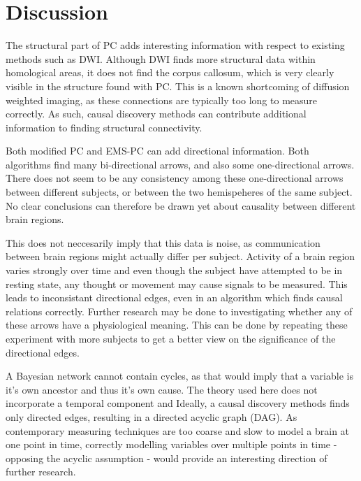 \documentclass[a4paper, 10pt, english, onecolumn]{article}
\begin{document}
\section{Discussion}

The structural part of PC adds interesting information with respect to existing methods such as DWI.
Although DWI finds more structural data within homological areas, it does not find the corpus callosum, which is very clearly visible in the structure found with PC.
This is a known shortcoming of diffusion weighted imaging, as these connections are typically too long to measure correctly.
As such, causal discovery methods can contribute additional information to finding structural connectivity.

Both modified PC and EMS-PC can add directional information.
Both algorithms find many bi-directional arrows, and also some one-directional arrows.
There does not seem to be any consistency among these one-directional arrows  between different subjects, or between the two hemispeheres of the same subject.
No clear conclusions can therefore be drawn yet about causality between different brain regions.

This does not neccesarily imply that this data is noise, as communication between brain regions might actually differ per subject.
Activity of a brain region varies strongly over time and even though the subject have attempted to be in resting state, any thought or movement may cause signals to be measured.
This leads to inconsistant directional edges, even in an algorithm which finds causal relations correctly.
Further research may be done to investigating whether any of these arrows have a physiological meaning.
This can be done by repeating these experiment with more subjects to get a better view on the significance of the directional edges.

A Bayesian network cannot contain cycles, as that would imply that a variable is it's own ancestor and thus it's own cause.
The theory used here does not incorporate a temporal component and 
Ideally, a causal discovery methods finds only directed edges, resulting in a directed acyclic graph (DAG).
As contemporary measuring techniques are too coarse and slow to model a brain at one point in time, correctly modelling variables over multiple points in time - opposing the acyclic assumption - would provide an interesting direction of further research.
\end{document}
